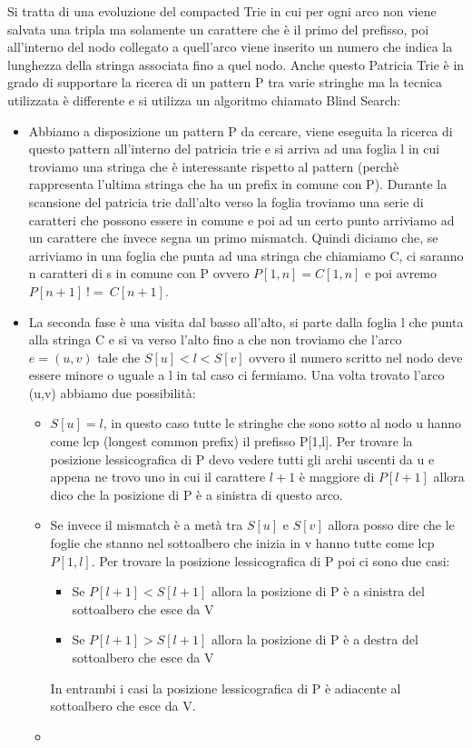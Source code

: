 \documentclass[14pt]{extreport}
\begin{document}
Si tratta di una evoluzione del compacted Trie in cui per ogni arco non viene salvata una tripla ma solamente un carattere che è il primo del prefisso, poi all'interno del nodo collegato a quell'arco viene inserito un numero che indica la lunghezza della stringa associata fino a quel nodo.
Anche questo Patricia Trie è in grado di supportare la ricerca di un pattern P tra varie stringhe ma la tecnica utilizzata è differente e si utilizza un algoritmo chiamato Blind Search:
\begin{itemize}
\item Abbiamo a disposizione un pattern P da cercare, viene eseguita la ricerca di questo pattern all'interno del patricia trie e si arriva ad una foglia l in cui troviamo una stringa che è interessante rispetto al pattern (perchè rappresenta l'ultima stringa che ha un prefix in comune con P).
Durante la scansione del patricia trie dall'alto verso la foglia troviamo una serie di caratteri che possono essere in comune e poi ad un certo punto arriviamo ad un carattere che invece segna un primo mismatch. Quindi diciamo che, se arriviamo in una foglia che punta ad una stringa che chiamiamo C, ci saranno n caratteri di s in comune con P ovvero $P[1,n]=C[1,n]$ e poi avremo $P[n+1]\ != \ C[n+1]$.
\item La seconda fase è una visita dal basso all'alto, si parte dalla foglia l che punta alla stringa C e si va verso l'alto fino a che non troviamo che l'arco $e=(u,v)$ tale che $S[u] < l < S[v]$ ovvero il numero scritto nel nodo deve essere minore o uguale a l in tal caso ci fermiamo.
Una volta trovato l'arco (u,v) abbiamo due possibilità:
\begin{itemize}
\item $S[u]=l$, in questo caso tutte le stringhe che sono sotto al nodo u hanno come lcp (longest common prefix) il prefisso P[1,l]. Per trovare la posizione lessicografica di P devo vedere tutti gli archi uscenti da u e appena ne trovo uno in cui il carattere $l+1$ è maggiore di $P[l+1]$ allora dico che la posizione di P è a sinistra di questo arco.
\item Se invece il mismatch è a metà tra $S[u]$ e $S[v]$ allora posso dire che le foglie che stanno nel sottoalbero che inizia in v hanno tutte come lcp $P[1,l]$. 
Per trovare la posizione lessicografica di P poi ci sono due casi:
\begin{itemize}
\item Se $P[l+1] < S[l+1]$ allora la posizione di P è a sinistra del sottoalbero che esce da V
\item Se $P[l+1] > S[l+1]$ allora la posizione di P è a destra del sottoalbero che esce da V
\end{itemize}
In entrambi i casi la posizione lessicografica di P è adiacente al sottoalbero che esce da V.
\item 
\end{itemize}
\end{itemize}
\end{document}
